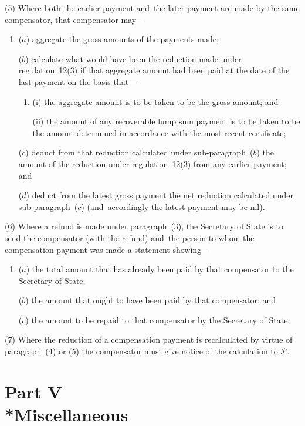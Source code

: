 \documentclass[12pt,a4paper]{article}
\begin{document}
(5) Where both the earlier payment and~the later payment are made by the same compensator, that compensator may—
\begin{enumerate}\item[]
($a$) aggregate the gross amounts of the payments made;

($b$) calculate what would have been the reduction made under regulation~12(3) if that aggregate amount had been paid at the date of the last payment on the basis that—
\begin{enumerate}\item[]
(i) the aggregate amount is to be taken to be the gross amount; and

(ii) the amount of any recoverable lump sum payment is to be taken to be the amount determined in accordance with the most recent certificate;
\end{enumerate}

($c$) deduct from that reduction calculated under sub-paragraph~($b$)  the amount of the reduction under regulation~12(3) from any earlier payment; and

($d$) deduct from the latest gross payment the net reduction calculated under sub-paragraph~($c$)  (and~accordingly the latest payment may be nil).
\end{enumerate}

(6) Where a refund is made under paragraph~(3), the Secretary of State is to send the compensator (with the refund) and~the person to whom the compensation payment was made a statement showing—
\begin{enumerate}\item[]
($a$) the total amount that has already been paid by that compensator to the Secretary of State;

($b$) the amount that ought to have been paid by that compensator; and

($c$) the amount to be repaid to that compensator by the Secretary of State.
\end{enumerate}

(7) Where the reduction of a compensation payment is recalculated by virtue of paragraph~(4) or (5) the compensator must give notice of the calculation to $\mathcal{P}$.

\section[Part V --- Miscellaneous]{Part V\\*Miscellaneous}
\end{document}
